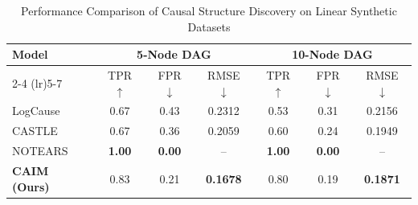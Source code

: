 \documentclass[sigconf, nonacm]{acmart}
\newcommand*{\ourmodel}{CAIM}
\begin{document}
\begin{table}[h]
  \caption{Performance Comparison of Causal Structure Discovery on Linear Synthetic Datasets}
  \label{tab:synthetic}
  \centering
  \small
  \setlength{\tabcolsep}{3pt}
  \begin{tabular}{l ccc ccc}
    \toprule
    Model
    & \multicolumn{3}{c}{5-Node DAG}
    & \multicolumn{3}{c}{10-Node DAG} \\
    \cmidrule(lr){2-4} \cmidrule(lr){5-7}
      & TPR $\uparrow$ & FPR $\downarrow$ & RMSE $\downarrow$
      & TPR $\uparrow$ & FPR $\downarrow$ & RMSE $\downarrow$ \\
    \midrule
    LogCause
      & 0.67 & 0.43 & 0.2312
      & 0.53 & 0.31 & 0.2156 \\
    CASTLE
      & 0.67 & 0.36 & 0.2059
      & 0.60 & 0.24 & 0.1949 \\
    NOTEARS
      & \textbf{1.00} & \textbf{0.00} & --
      & \textbf{1.00} & \textbf{0.00} & -- \\
    \textbf{\ourmodel{} (Ours)}
      & 0.83 & 0.21 & \textbf{0.1678}
      & 0.80 & 0.19 & \textbf{0.1871} \\
    \bottomrule
  \end{tabular}
\end{table}
\end{document}
